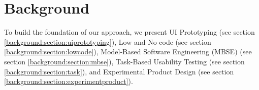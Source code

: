 
\chapter{Background}
\ifpdf
    \graphicspath{{Chapters/Background/Figs/}{Chapters/Background/Figs/}{Chapters/Background/Figs/}}
\else
    \graphicspath{{Chapters/Background/Figs/}{Chapters/Background/Figs/}}
\fi
To build the foundation of our approach, we present UI Prototyping (see section \ref{background:section:uiprototyping}), Low and No code (see section \ref{background:section:lowcode}), Model-Based Software Engineering (MBSE) (see section \ref{background:section:mbse}), Task-Based Usability Testing (see section \ref{background:section:task}), and Experimental Product Design (see section \ref{background:section:experimentproduct}).

